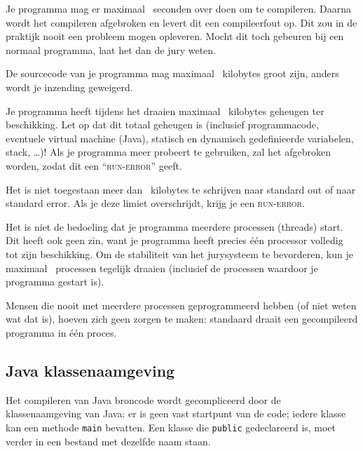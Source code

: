 \begin{description}
\item[compile-tijd]
Je programma mag er maximaal \COMPILETIME\ seconden over doen om te
compileren. Daarna wordt het compileren afgebroken en levert dit een
compileerfout op. Dit zou in de praktijk nooit een probleem mogen
opleveren. Mocht dit toch gebeuren bij een normaal programma, laat het
dan de jury weten.

\item[sourcegrootte]
De sourcecode van je programma mag maximaal \SOURCESIZE\ kilobytes
groot zijn, anders wordt je inzending geweigerd.

\item[geheugen]
Je programma heeft tijdens het draaien maximaal \MEMLIMIT\ kilobytes
geheugen ter beschikking. Let op dat dit totaal geheugen is (inclusief
programmacode, eventuele virtual machine (Java), statisch en dynamisch
gedefinieerde variabelen, stack, \dots)! Als je programma meer
probeert te gebruiken, zal het afgebroken worden, zodat dit een
``\textsc{run-error}'' geeft.

\item[uitvoergrootte]
Het is niet toegestaan meer dan \FILELIMIT\ kilobytes te schrijven naar
standard out of naar standard error. Als je deze limiet overschrijdt,
krijg je een \textsc{run-error}.

\item[aantal processen]
Het is niet de bedoeling dat je programma meerdere processen (threads)
start. Dit heeft ook geen zin, want je programma heeft precies \'e\'en
processor volledig tot zijn beschikking. Om de stabiliteit van het
jurysysteem te bevorderen, kun je maximaal \PROCLIMIT\ processen
tegelijk draaien (inclusief de processen waardoor je programma
gestart is).

Mensen die nooit met meerdere processen geprogrammeerd hebben (of
niet weten wat dat is), hoeven zich geen zorgen te maken: standaard
draait een gecompileerd programma in \'e\'en proces.

\end{description}

\subsection{Java klassenaamgeving}

Het compileren van Java broncode wordt gecompliceerd door de
klassenaamgeving van Java: er is geen vast startpunt van de code;
iedere klasse kan een methode \texttt{main} bevatten. Een klasse die
\texttt{public} gedeclareerd is, moet verder in een bestand met
dezelfde naam staan.

